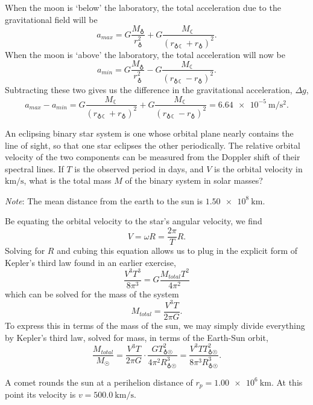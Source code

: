 \documentclass[../feynman-lectures-on-physics.tex]{subfiles}
\begin{document}
\begin{questions}
	\begin{solution}
		When the moon is `below' the laboratory, the total acceleration due to the gravitational field will be 
		\[
			a_{max} = G\frac{M_\varEarth}{r_\varEarth^2} + G\frac{M_\leftmoon}{(r_{\varEarth\leftmoon} + r_\varEarth)^2}
		.\] 
		When the moon is `above' the laboratory, the total acceleration will now be
		\[
			a_{min} = G\frac{M_\varEarth}{r_\varEarth^2} - G\frac{M_\leftmoon}{(r_{\varEarth\leftmoon} - r_\varEarth)^2}
		.\] 
		Subtracting these two gives us the difference in the gravitational acceleration, $\Delta{g}$,
		\[
			a_{max} - a_{min} = G\frac{M_\leftmoon}{(r_{\varEarth\leftmoon} + r_\varEarth)^2 } + G\frac{M_\leftmoon}{(r_{\varEarth\leftmoon} - r_\varEarth)^2} = \SI{6.64e-5}{\meter\per\second\squared}
		.\] 
	\end{solution}

	\question An eclipsing binary star system is one whose orbital plane nearly contains the line of sight, so that one star eclipses the other periodically. The relative orbital velocity of the two components can be measured from the Doppler shift of their spectral lines. If $T$ is the observed period in days, and $V$ is the orbital velocity in $\si{\kilo\meter\per\second}$, what is the total mass $M$ of the binary system in solar masses?

	\textit{Note}: The mean distance from the earth to the sun is $\SI{1.50e8}{\kilo\meter}$.

	\begin{solution}
		Be equating the orbital velocity to the star's angular velocity, we find
		\[
			V = \omega{R} = \frac{2\pi}{T}R
		.\] 
		Solving for $R$ and cubing this equation allows us to plug in the explicit form of Kepler's third law found in an earlier exercise,
		\[
			\frac{V^3T^3}{8\pi^3} = G\frac{M_{total}T^2}{4\pi^2}
		\] 
		which can be solved for the mass of the system
		\[
			M_{total} = \frac{V^3T}{2\pi{G}}
		.\] 
		To express this in terms of the mass of the sun, we may simply divide everything by Kepler's third law, solved for mass, in terms of the Earth-Sun orbit,
		\[
			\frac{M_{total}}{M_{\Sun}} = \frac{V^3T}{2\pi{G}}\cdot\frac{GT^2_{\varEarth\Sun}}{4\pi^2R^3_{\varEarth\Sun}} = \frac{V^3TT^2_{\varEarth\Sun}}{8\pi^3R^3_{\varEarth\Sun}}
		.\] 
	\end{solution}

	\question A comet rounds the sun at a perihelion distance of $r_p = \SI{1.00e6}{\kilo\meter}$. At this point its velocity is $v = \SI{500.0}{\kilo\meter\per\second}$.
	\begin{parts}

\end{parts}
\end{questions}
\end{document}
